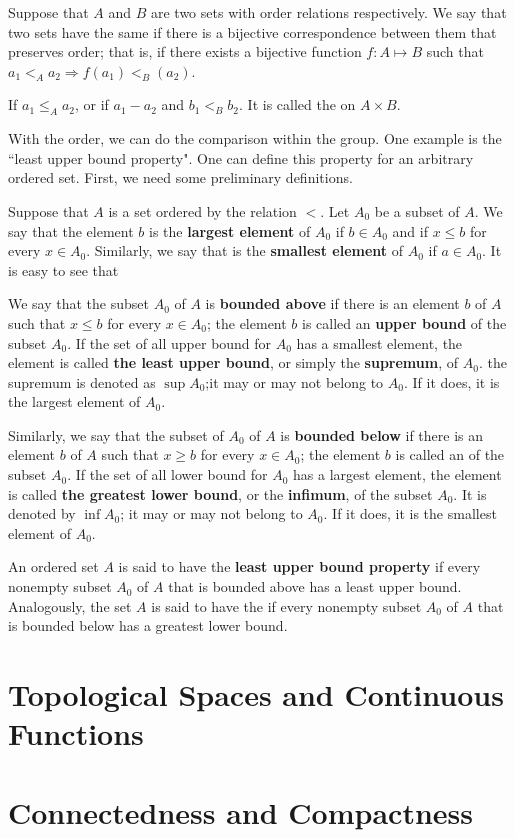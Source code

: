 \begin{definition}
Suppose that $A$ and $B$ are two sets with order relations respectively. We say that two sets have the same \textbf{} if there is a bijective correspondence between them that preserves order; that is, if there exists a bijective function $f:A \mapsto B$ such that $a_1 <_A a_2 \Rightarrow f(a_1) <_B (a_2)$.
\end{definition}

\begin{definition}
If $a_1 \leq_A a_2$, or if $a_1 - a_2$ and $b_1 <_B b_2$. It is called the \textbf{} on $A \times B$. 
\end{definition}

With the order, we can do the comparison within the group. One example is the ``least upper bound property". One can define this property for an arbitrary ordered set. First, we need some preliminary definitions.

Suppose that $A$ is a set ordered by the relation $<$. Let $A_0$ be a subset of $A$. We say that the element $b$ is the \textbf{largest element} of $A_0$ if $b \in A_0$ and if $x \leq b$ for every  $x \in A_0$. Similarly, we say that is the \textbf{smallest element} of $A_0$ if $a \in A_0$. It is easy to see that 

We say that the subset $A_0$ of $A$ is \textbf{bounded above} if there is an element $b$ of $A$ such that $x \leq b$ for every $x \in A_0$; the element $b$ is called an \textbf{upper bound} of the subset $A_0$. If the set of all upper bound for $A_0$ has a smallest element, the element is called \textbf{the least upper bound}, or simply the \textbf{supremum}, of $A_0$. the supremum is denoted as $\sup{A_0}$;it may or may not belong to $A_0$. If it does, it is the largest element of $A_0$.

Similarly, we say that the subset of $A_0$ of $A$ is \textbf{bounded below} if there is an element $b$ of $A$ such that $x \geq b$ for every $x \in A_0$; the element $b$ is called an  of the subset $A_0$. If the set of all lower bound for $A_0$ has a largest element, the element is called \textbf{the greatest lower bound}, or the \textbf{infimum}, of the subset $A_0$. It is denoted by $\inf{A_0}$; it may or may not belong to $A_0$. If it does, it is the smallest element of $A_0$.

\begin{definition}
An ordered set $A$ is said to have the \textbf{least upper bound property} if every nonempty subset $A_0$ of $A$ that is bounded above has a least upper bound. Analogously, the set $A$ is said to have the \textbf{} if every nonempty subset $A_0$ of $A$ that is bounded below has a greatest lower bound.
\end{definition}


\section{Topological Spaces and Continuous Functions}

\section{Connectedness and Compactness}
